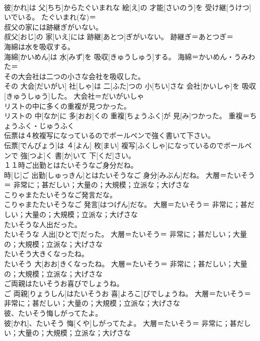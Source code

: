 \documentclass[8pt]{extreport}
\begin{document}
\begin{CJK}{UTF8}{min}
\\	彼[かれ]は 父[ちち]からたぐいまれな 絵[え]の 才能[さいのう]を 受け継[うけつ]いでいる。	たぐいまれ(な)＝ 
\\	叔父の家には跡継ぎがいない。	
\\	叔父[おじ]の 家[いえ]には 跡継[あとつ]ぎがいない。	跡継ぎ＝あとつぎ＝ 
\\	海綿は水を吸収する。	
\\	海綿[かいめん]は 水[みず]を 吸収[きゅうしゅう]する。	海綿＝かいめん・うみわた＝ 
\\	その大会社は二つの小さな会社を吸収した。	
\\	その 大会[だいがい] 社[しゃ]は 二[ふた]つの 小[ちい]さな 会社[かいしゃ]を 吸収[きゅうしゅう]した。	大会社＝だいがいしゃ
\\	リストの中に多くの重複が見つかった。	
\\	リストの 中[なか]に 多[おお]くの 重複[ちょうふく]が 見[み]つかった。	重複＝ちょうふく・じゅうふく
\\	伝票は４枚複写になっているのでボールペンで強く書いて下さい。	
\\	伝票[でんぴょう]は ４[よん] 枚[まい] 複写[ふくしゃ]になっているのでボールペンで 強[つよ]く 書[か]いて 下[くだ]さい。	
\\	１１時ご出勤とはたいそうなご身分だね。	
\\	時[じ]ご 出勤[しゅっきん]とはたいそうなご 身分[みぶん]だね。	大層＝たいそう＝ 非常に；甚だしい；大量の；大規模；立派な；大げさな
\\	こりゃまたたいそうなご発言だな。	
\\	こりゃまたたいそうなご 発言[はつげん]だな。	大層＝たいそう＝ 非常に；甚だしい；大量の；大規模；立派な；大げさな
\\	たいそうな人出だった。	
\\	たいそうな 人出[ひとで]だった。	大層＝たいそう＝ 非常に；甚だしい；大量の；大規模；立派な；大げさな
\\	たいそう大きくなったね。	
\\	たいそう 大[おお]きくなったね。	大層＝たいそう＝ 非常に；甚だしい；大量の；大規模；立派な；大げさな
\\	ご両親はたいそうお喜びでしょうね。	
\\	ご 両親[りょうしん]はたいそうお 喜[よろこ]びでしょうね。	大層＝たいそう＝ 非常に；甚だしい；大量の；大規模；立派な；大げさな
\\	彼、たいそう悔しがってたよ。	
\\	彼[かれ]、たいそう 悔[くや]しがってたよ。	大層＝たいそう＝ 非常に；甚だしい；大量の；大規模；立派な；大げさな

\end{CJK}
\end{document}
